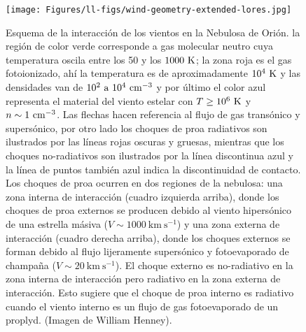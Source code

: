 \begin{figure}
  \centering
  \texttt{[image: Figures/ll-figs/wind-geometry-extended-lores.jpg]}
  \caption{Esquema de la interacción de los vientos en la Nebulosa de Orión. la región de color verde corresponde a gas molecular neutro cuya temperatura oscila entre los 50 y los \(1000~\mathrm{K}\); la zona roja es el gas fotoionizado, ahí la temperatura es de aproximadamente \(10^{4}~\mathrm{K}\) y las densidades van de \(10^{2} ~\text{a}~10^{4} ~\mathrm{cm}^{-3}\) y por último el color azul representa el material del viento estelar con \(T \geq 10^{6}~\mathrm{K}\) y \(n \sim 1~\mathrm{cm}^{-3}\). Las flechas hacen referencia al flujo de gas transónico y supersónico, por otro lado los choques de proa radiativos son ilustrados por las líneas rojas oscuras y gruesas, mientras que los choques no-radiativos son ilustrados por la línea discontinua azul y la línea de puntos también azul indica la discontinuidad de contacto. Los choques de proa ocurren en dos regiones de la nebulosa: una zona interna de interacción (cuadro izquierda arriba), donde los choques de proa externos se producen debido al viento hipersónico de una estrella másiva (\(V \sim 1000~\text{km}~\text{s}^{-1}\)) y una zona externa de interacción (cuadro derecha arriba), donde los choques externos se forman debido al flujo lijeramente supersónico y fotoevaporado de champaña (\(V \sim 20~\text{km}~\text{s}^{-1}\)). El choque externo es no-radiativo en la zona interna de interacción pero radiativo en la zona externa de interacción. Esto sugiere que el choque de proa interno es radiativo cuando el viento interno es un flujo de gas fotoevaporado de un proplyd. (Imagen de William Henney).}
  \label{fig:esquema-interraccion-vientos}
\end{figure}

